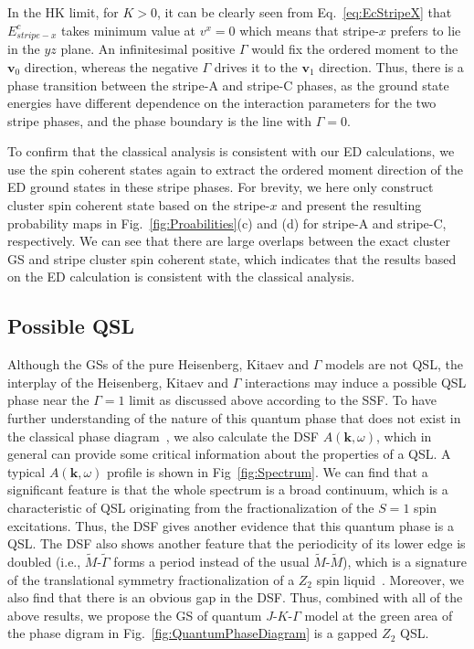 \documentclass[aps,prb,reprint,amsfonts,amsmath,amssymb,showpacs,groupedaddress,superscriptaddress]{revtex4-1}
\begin{document}
In the HK limit, for $K>0$, it can be clearly seen from Eq.~\eqref{eq:EcStripeX} that $E_{stripe-x}^{c}$ takes minimum value at $v^x = 0$ which means that stripe-$x$ prefers to lie in the $yz$ plane. An infinitesimal positive $\Gamma$ would fix the ordered moment to the $\bm{v}_0$ direction, whereas the negative $\Gamma$ drives it to the $\bm{v}_1$ direction. Thus, there is a phase transition between the stripe-A and stripe-C phases, as the ground state energies have different dependence on the interaction parameters for the two stripe phases, and the phase boundary is the line with $\Gamma=0$.

To confirm that the classical analysis is consistent with our ED calculations, we use the spin coherent states again to extract the ordered moment direction of the ED ground states in these stripe phases. For brevity, we here only construct cluster spin coherent state based on the stripe-$x$ and present the resulting probability maps in Fig.~\ref{fig:Proabilities}(c) and (d) for stripe-A and stripe-C, respectively. We can see that there are large overlaps between the exact cluster GS and stripe cluster spin coherent state, which indicates that the results based on the ED calculation is consistent with the classical analysis.

\subsection{\label{subsec:QSL}Possible QSL}

Although the GSs of the pure Heisenberg, Kitaev and $\Gamma$ models are not QSL, the interplay of the Heisenberg, Kitaev and $\Gamma$ interactions may induce a possible QSL phase near the $\Gamma=1$ limit as discussed above according to the SSF. To have further understanding of the nature of this quantum phase that does not exist in the classical phase diagram~\cite{PhysRevB.92.165108}, we also calculate the DSF $A(\mathbf{k}, \omega)$, which in general can provide some critical information about the properties of a QSL. A typical $A(\mathbf{k}, \omega)$ profile is shown in Fig~\ref{fig:Spectrum}. We can find that a significant feature is that the whole spectrum is a broad continuum, which is a characteristic of QSL originating from the fractionalization of the $S=1$ spin excitations. Thus, the DSF gives another evidence that this quantum phase is a QSL. The DSF also shows another feature that the periodicity of its lower edge is doubled (i.e., $\tilde{M}$-$\tilde{\Gamma}$ forms a period instead of the usual $\tilde{M}$-$\tilde{M}$), which is a signature of the translational symmetry fractionalization of a $Z_{2}$ spin liquid~\cite{PhysRevB.90.121102,mei2015fractionalized,PhysRevB.99.205119}. Moreover, we also find that there is an obvious gap in the DSF. Thus, combined with all of the above results, we propose the GS of quantum $J$-$K$-$\Gamma$ model at the green area of the phase digram in Fig.~\ref{fig:QuantumPhaseDiagram} is a gapped $Z_{2}$ QSL.
\end{document}
